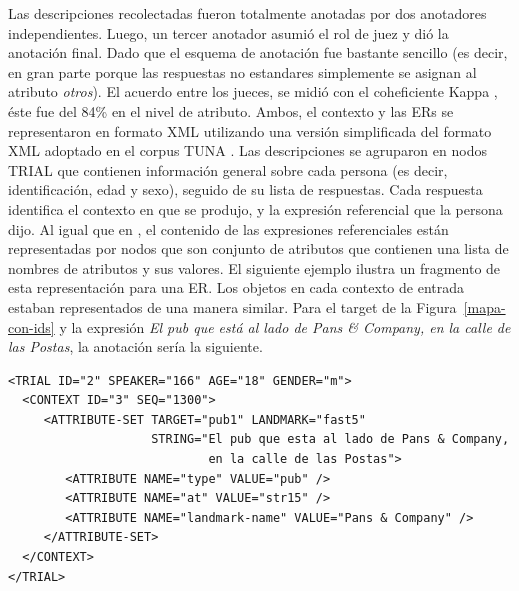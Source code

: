 
Las descripciones recolectadas fueron totalmente anotadas por dos anotadores independientes. Luego, un tercer anotador asumi\'o el rol de juez y di\'o la anotaci\'on final. Dado que el esquema de anotaci\'on fue bastante sencillo (es decir, en gran parte porque las respuestas no estandares simplemente se asignan al atributo {\em otros}). El acuerdo entre los jueces, se midi\'o con el coheficiente Kappa \cite{kappa}, \'este fue del 84\% en el nivel de atributo.
Ambos, el contexto y las ERs se representaron en formato XML utilizando una versi\'on simplificada del formato XML adoptado en el corpus TUNA \cite{tuna-corpus}. Las descripciones se agruparon en nodos TRIAL que contienen informaci\'on general sobre cada persona (es decir, identificaci\'on, edad y sexo), seguido de su lista de respuestas. Cada respuesta identifica el contexto en que se produjo, y la expresi\'on referencial que la persona dijo.
Al igual que en \cite{tuna-corpus}, el contenido de las expresiones referenciales est\'an representadas por nodos que son conjunto de atributos que contienen una lista de nombres de atributos y sus valores. El siguiente ejemplo ilustra un fragmento de esta representaci\'on para una ER. Los objetos en cada contexto de entrada estaban representados de una manera similar.
Para el target de la Figura~\ref{mapa-con-ids} y la expresi\'on {\it El pub que est\'a al lado de Pans \& Company, en la
calle de las Postas}, la anotaci\'on ser\'ia la siguiente.
\begin{verbatim}
<TRIAL ID="2" SPEAKER="166" AGE="18" GENDER="m">
  <CONTEXT ID="3" SEQ="1300">
     <ATTRIBUTE-SET TARGET="pub1" LANDMARK="fast5" 
                    STRING="El pub que esta al lado de Pans & Company, 
                            en la calle de las Postas">
        <ATTRIBUTE NAME="type" VALUE="pub" />
        <ATTRIBUTE NAME="at" VALUE="str15" />
        <ATTRIBUTE NAME="landmark-name" VALUE="Pans & Company" />
     </ATTRIBUTE-SET>
  </CONTEXT>
</TRIAL>	
\end{verbatim}



